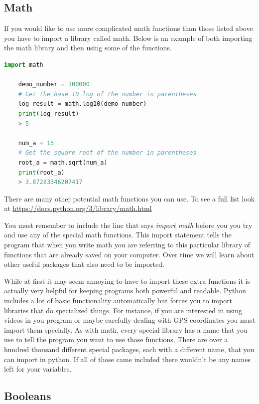 \documentclass[]{article}
\begin{document}
\subsection{ Math }

If you would like to use more complicated math functions than those listed above you have to import a library called math. Below is an example of both importing the math library and then using some of the functions.

\begin{lstlisting}[language=python]
    import math
    
    demo_number = 100000
    # Get the base 10 log of the number in parentheses
    log_result = math.log10(demo_number)
    print(log_result)
    > 5
    
    num_a = 15
    # Get the square root of the number in parentheses
    root_a = math.sqrt(num_a)
    print(root_a)
    > 3.87283346207417
\end{lstlisting}

There are many other potential math functions you can use.  To see a full list look at \href{https://docs.python.org/3/library/math.html}{https://docs.python.org/3/library/math.html} 

You must remember to include the line that says \textit{import math} before you you try and use any of the special math functions.  This import statement tells the program that when you write math you are referring to this particular library of functions that are already saved on your computer.  Over time we will learn about other useful packages that also need to be imported. 

While at first it may seem annoying to have to import these extra functions it is actually very helpful for keeping programs both powerful and readable.  Python includes a lot of basic functionality automatically but forces you to import libraries that do specialized things. For instance, if you are interested in using videos in you program or maybe carefully dealing with GPS coordinates you must import them specially. As with math, every special library has a name that you use to tell the program you want to use those functions.  There are over a hundred thousand different special packages, each with a different name, that you can import in python. If all of those came included there wouldn't be any names left for your variables.   



\subsection{ Booleans }
\end{document}
